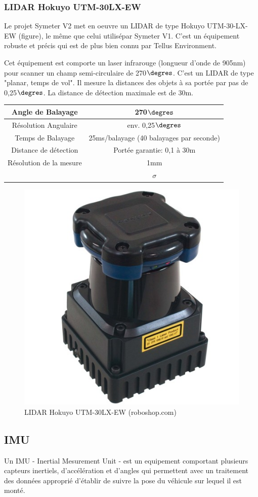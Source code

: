 \documentclass[12pt,a4paper]{report}
\begin{document}
	
		
		\subsubsection{LIDAR Hokuyo UTM-30LX-EW}
		Le projet Symeter V2 met en oeuvre un LIDAR de type Hokuyo UTM-30-LX-EW (figure), le même que celui utilisépar Symeter V1. C'est un équipement robuste et précis qui est de plus bien connu par Tellus Environment.
		
		\para Cet équipement est comporte un laser infrarouge (longueur d'onde de 905nm) pour scanner un champ semi-circulaire de 270$\degres$. C'est un LIDAR de type "planar, temps de vol". Il mesure la distances des objets à sa portée par pas de 0,25$\degres$. La distance de détection maximale est de 30m.
		\newline
		
		
		\begin{tabular}{|c|c|}
			\hline 
			Angle de Balayage & 270$\degres$ \\ 
			\hline 
			Résolution Angulaire & env. 0,25$\degres$ \\ 
			\hline
			Temps de Balayage & 25ms/balayage (40 balayages par seconde) \\
			\hline
			Distance de détection & Portée garantie: 0,1 à 30m \\
			\hline
			Résolution de la mesure & 1mm \\
			& $\sigma$ \\
			\hline
		\end{tabular} 
	
		\begin{figure}[h!]
			\centering
			\includegraphics[width=0.3\linewidth]{img/hokuyo-utm-30lx-ew-scanning-laser-rangefinder}
			\caption[hokuyo]{LIDAR Hokuyo UTM-30LX-EW (roboshop.com)}
			\label{fig:hokuyo-utm-30lx-ew-scanning-laser-rangefinder}
		\end{figure}
	
		
		\subsection{IMU}
		Un IMU - Inertial Mesurement Unit - est un equipement comportant plusieurs capteurs inertiels, d'accélération et d'angles qui permettent avec un traitement des données approprié d'établir de suivre la pose du véhicule sur lequel il est monté.
		
\end{document}
